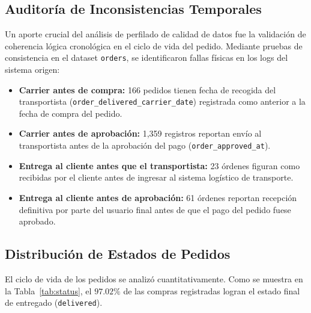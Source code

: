 \documentclass[journal,letterpaper]{IEEEtran}
\begin{document}
\begin{table}[h]
\centering
\caption{Valores Faltantes Críticos en Datasets Crudos}
\label{tab:nulls}
\end{table}

\subsection{Auditoría de Inconsistencias Temporales}
Un aporte crucial del análisis de perfilado de calidad de datos fue la validación de coherencia lógica cronológica en el ciclo de vida del pedido. Mediante pruebas de consistencia en el dataset \texttt{orders}, se identificaron fallas físicas en los logs del sistema origen:
\begin{itemize}
    \item \textbf{Carrier antes de compra:} 166 pedidos tienen fecha de recogida del transportista (\texttt{order\_delivered\_carrier\_date}) registrada como anterior a la fecha de compra del pedido.
    \item \textbf{Carrier antes de aprobación:} 1,359 registros reportan envío al transportista antes de la aprobación del pago (\texttt{order\_approved\_at}).
    \item \textbf{Entrega al cliente antes que el transportista:} 23 órdenes figuran como recibidas por el cliente antes de ingresar al sistema logístico de transporte.
    \item \textbf{Entrega al cliente antes de aprobación:} 61 órdenes reportan recepción definitiva por parte del usuario final antes de que el pago del pedido fuese aprobado.
\end{itemize}

\subsection{Distribución de Estados de Pedidos}
El ciclo de vida de los pedidos se analizó cuantitativamente. Como se muestra en la Tabla~\ref{tab:status}, el $97.02\%$ de las compras registradas logran el estado final de entregado (\texttt{delivered}).
\end{document}
